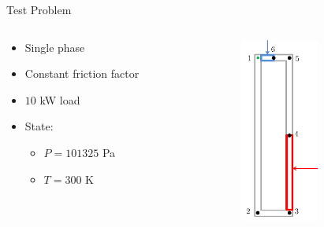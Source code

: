 \documentclass[10pt,t,xcolor=table]{beamer}
\newenvironment{Itemize}
    {\begin{itemize}\setlength{\itemsep}{0.8em}\setlength{\leftmargin}{0.0em}\setlength{\labelwidth}{0em}}
    {\end{itemize}}
\begin{document}
    
    \begin{frame}{Test Problem}
            \begin{columns}[T]
            
                \begin{column}[T]{0.85\textwidth}
                    \begin{Itemize}
                        \item{Single phase}
                        \item{Constant friction factor}
                        \item{$10$ kW load}
                        \item{State:}
                            \begin{Itemize}
                                \item{$P = 101325$ Pa}
                                \item{$T = 300$ K}
                            \end{Itemize}
                    \end{Itemize}
                \end{column}
                \hspace{1em}
                \begin{column}[T]{0.24\textwidth}
                    \includegraphics[height=2.4in]{SimpleNatCirc}
                \end{column}
            \end{columns}
        \end{frame}
        
\end{document}
